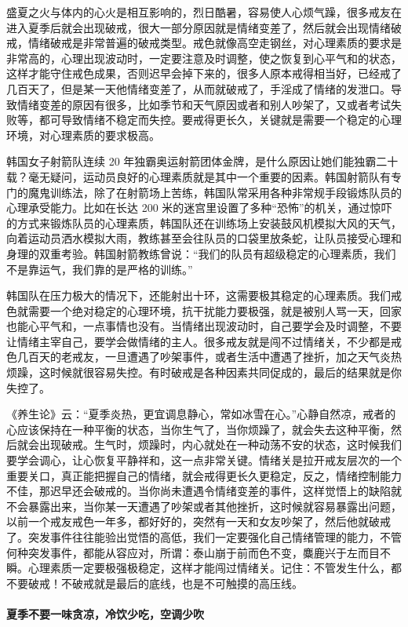 盛夏之火与体内的心火是相互影响的，烈日酷暑，容易使人心烦气躁，很多戒友在进入夏季后就会出现破戒，很大一部分原因就是情绪变差了，然后就会出现情绪破戒，情绪破戒是非常普遍的破戒类型。戒色就像高空走钢丝，对心理素质的要求是非常高的，心理出现波动时，一定要注意及时调整，使之恢复到心平气和的状态，这样才能守住戒色成果，否则迟早会掉下来的，很多人原本戒得相当好，已经戒了几百天了，但是某一天他情绪变差了，从而就破戒了，手淫成了情绪的发泄口。导致情绪变差的原因有很多，比如季节和天气原因或者和别人吵架了，又或者考试失败等，都可导致情绪不稳定而失控。要戒得更长久，关键就是需要一个稳定的心理环境，对心理素质的要求极高。

韩国女子射箭队连续 20 年独霸奥运射箭团体金牌，是什么原因让她们能独霸二十载？毫无疑问，运动员良好的心理素质就是其中一个重要的因素。韩国射箭队有专门的魔鬼训练法，除了在射箭场上苦练，韩国队常采用各种非常规手段锻炼队员的心理承受能力。比如在长达 200 米的迷宫里设置了多种“恐怖”的机关，通过惊吓的方式来锻炼队员的心理素质，韩国队还在训练场上安装鼓风机模拟大风的天气，向着运动员洒水模拟大雨，教练甚至会往队员的口袋里放条蛇，让队员接受心理和身理的双重考验。韩国射箭教练曾说：“我们的队员有超级稳定的心理素质，我们不是靠运气，我们靠的是严格的训练。”

韩国队在压力极大的情况下，还能射出十环，这需要极其稳定的心理素质。我们戒色就需要一个绝对稳定的心理环境，抗干扰能力要极强，就是被别人骂一天，回家也能心平气和，一点事情也没有。当情绪出现波动时，自己要学会及时调整，不要让情绪主宰自己，要学会做情绪的主人。很多戒友就是闯不过情绪关，不少都是戒色几百天的老戒友，一旦遭遇了吵架事件，或者生活中遭遇了挫折，加之天气炎热烦躁，这时候就很容易失控。有时破戒是各种因素共同促成的，最后的结果就是你失控了。

《养生论》云：“夏季炎热，更宜调息静心，常如冰雪在心。”心静自然凉，戒者的心应该保持在一种平衡的状态，当你生气了，当你烦躁了，就会失去这种平衡，然后就会出现破戒。生气时，烦躁时，内心就处在一种动荡不安的状态，这时候我们要学会调心，让心恢复平静祥和，这一点非常关键。情绪关是拉开戒友层次的一个重要关口，真正能把握自己的情绪，就会戒得更长久更稳定，反之，情绪控制能力不佳，那迟早还会破戒的。当你尚未遭遇令情绪变差的事件，这样觉悟上的缺陷就不会暴露出来，当你某一天遭遇了吵架或者其他挫折，这时候就容易暴露出问题，以前一个戒友戒色一年多，都好好的，突然有一天和女友吵架了，然后他就破戒了。突发事件往往能验出觉悟的高低，我们一定要强化自己情绪管理的能力，不管何种突发事件，都能从容应对，所谓：泰山崩于前而色不变，麋鹿兴于左而目不瞬。心理素质一定要极强极稳定，这样才能闯过情绪关。记住：不管发生什么，都不要破戒！不破戒就是最后的底线，也是不可触摸的高压线。

\paragraph{夏季不要一味贪凉，冷饮少吃，空调少吹}

